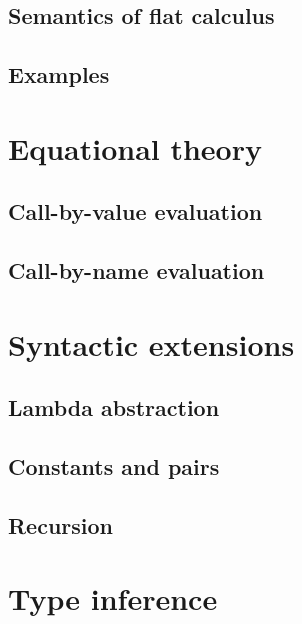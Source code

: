 \subsection{Semantics of flat calculus}
\subsection{Examples}


\section{Equational theory}
\label{sec:flat-syntax}

\subsection{Call-by-value evaluation}
\subsection{Call-by-name evaluation}


\section{Syntactic extensions}
\label{sec:flat-exts}

\subsection{Lambda abstraction}
\subsection{Constants and pairs}
\subsection{Recursion}


\section{Type inference}
\label{sec:flat-inference}

